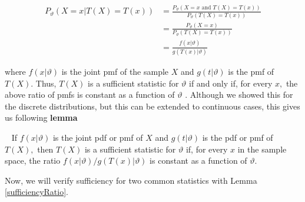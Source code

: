 \documentclass[ 11pt,%
				a4paper,%
				twoside,%
				headinclude,%
				footinclude = true,%
				cleardoublepage = empty,%
				reqno]{scrbook}
\begin{document}
\begin{align*}
  P_{\vartheta}(X=x | T(X)=T(x)) &=\frac{P_{\vartheta}(X=x \text { and } T(X)=T(x))}{P_{\vartheta}({T}(X)=T(x))} \\
&=\frac{P_{\vartheta}(X=x)}{P_{\vartheta}(T(X)=T(x))} \\
&=\frac{f(x | \vartheta)}{g(T(x) | \vartheta)}
\end{align*}


where $f(x | \vartheta)$ is the joint pmf of the sample $X$ and $g(t | \vartheta)$ is the pmf of $T(X)$. Thus, $T(X)$ is a sufficient statistic for $\vartheta$ if and only if, for every $x,$ the above ratio of pmfs is constant as a function of $\vartheta$ . Although we showed this for the discrete distributions, but this can be extended to continuous cases, this gives us following \textbf{lemma}

\begin{lemma}
~\label{sufficiencyRatio}
  If $f(x | \vartheta)$ is the joint pdf or pmf of $X$ and $g(t | \vartheta)$ is the pdf or pmf of $T(X),$ then $T(X)$ is a sufficient statistic for $\vartheta$ if, for every $x$ in the sample space, the ratio $f(x | \vartheta) / g(T(x) | \vartheta)$ is constant as a function of $\vartheta$.
\end{lemma}

Now, we will verify sufficiency for two common statistics with Lemma \ref{sufficiencyRatio}.
\end{document}
